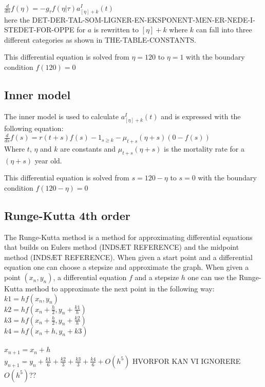 $\frac{d}{dn}f(\eta) = -g_\tau f(\eta|\tau)a_{[\eta]+k}^I(t)$ \\

here the DET-DER-TAL-SOM-LIGNER-EN-EKSPONENT-MEN-ER-NEDE-I-STEDET-FOR-OPPE for $a$ is rewritten to $[\eta]+k$ where $k$ can fall into three different categories as shown in THE-TABLE-CONSTANTS. 

This differential equation is solved from $\eta = 120$ to $\eta = 1$ with the boundary condition $f(120) = 0$

\subsection{Inner model}
The inner model is used to calculate $a_{[\eta]+k}^I(t)$ and is expressed with the following equation: \\

$\frac{d}{ds}f(s) = r(t+s)f(s) - 1_{s \geq k} - \mu_{t+s}(\eta + s)(0 - f(s))$ \\

Where $t$, $\eta$ and $k$ are constants and $\mu_{t+s}(\eta + s)$ is the mortality rate for a $(\eta + s)$ year old.

This differential equation is solved from $s = 120 - \eta$ to $s = 0$ with the boundary condition $f(120 - \eta) = 0$

\subsection{Runge-Kutta 4th order}
The Runge-Kutta method is a method for approximating differential equations that builds on Eulers method (INDSÆT REFERENCE) and the midpoint method (INDSÆT REFERENCE). When given a start point and a differential equation one can choose a stepsize and approximate the graph.
When given a point $(x_n,y_n)$, a differential equation $f$ and a stepsize $h$ one can use the Runge-Kutta method to approximate the next point in the following way: \\

\noindent $k1 = h f(x_n, y_n)$ \\
$k2 = h f(x_n + \frac{h}{2}, y_n + \frac{k1}{h} )$ \\
$k3 = h f(x_n + \frac{h}{2}, y_n + \frac{k2}{h} )$ \\
$k4 = h f(x_n + h, y_n + k3 )$ \\ \\
$x_{n + 1} = x_n + h$ \\
$y_{n + 1} = y_n + \frac{k1}{6} + \frac{k2}{3} + \frac{k3}{3} + \frac{k4}{6} + O(h^5)$ HVORFOR KAN VI IGNORERE $O(h^5)$??
